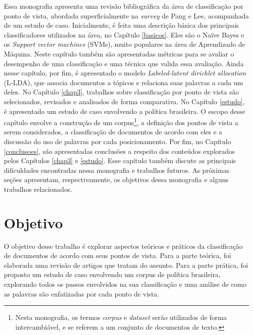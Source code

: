 Essa monografia apresenta uma revisão bibliográfica da área de classificação por ponto de vista, abordada superficialmente na \emph{survey} de Pang e Lee, acompanhada de um estudo de caso. Inicialmente, é feita uma descrição básica dos principais classificadores utilizados na área, no Capítulo \ref{basicos}. Eles são o Naïve Bayes e os \emph{Support vector machines} (SVMs), muito populares na área de Aprendizado de Máquina. Neste capítulo também são apresentadas métricas para se avaliar o desempenho de uma classificação e uma técnica que valida essa avaliação. Ainda nesse capítulo, por fim, é apresentado o modelo \emph{Labeled-latent dirichlet allocation} (L-LDA), que associa documentos a tópicos e relaciona suas palavras a cada um deles. No Capítulo \ref{chap3}, trabalhos sobre classificação por ponto de vista são selecionados, revisados e analisados de forma comparativa. No Capítulo \ref{estudo}, é apresentado um estudo de caso envolvendo a política brasileira. O escopo desse capítulo envolve a construção de um corpus\footnote{Nesta monografia, os termos \emph{corpus} e \emph{dataset} serão utilizados de forma intercambiável, e se referem a um conjunto de documentos de texto.}, a definição dos pontos de vista a serem considerados, a classificação de documentos de acordo com eles e a discussão do uso de palavras por cada posicionamento. Por fim, no Capítulo \ref{conclusoes}, são apresentadas conclusões a respeito dos conteúdos explorados pelos Capítulos \ref{chap3} e \ref{estudo}. Esse capítulo também discute as principais dificuldades encontradas nessa monografia e trabalhos futuros. As próximas seções apresentam, respectivamente, os objetivos dessa monografia e alguns trabalhos relacionados.



\section{Objetivo}
\label{objetivo}

O objetivo desse trabalho é explorar aspectos teóricos e práticos da classificação de documentos de acordo com seus pontos de vista. Para a parte teórica, foi elaborada uma revisão de artigos que tratam do assunto. Para a parte prática, foi proposto um estudo de caso envolvendo um corpus de política brasileira, explorando todos os passos envolvidos na sua classificação e uma análise de como as palavras são enfatizadas por cada ponto de vista. 

